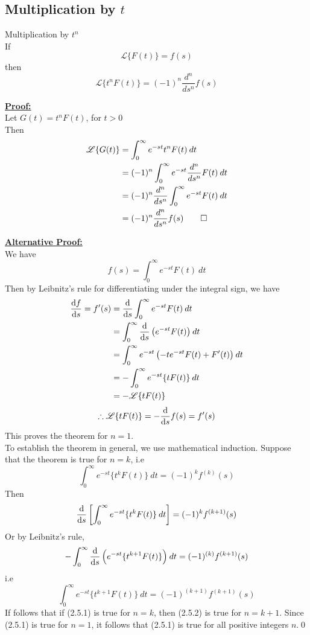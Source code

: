 \documentclass[12pt]{article}
\newcommand{\Lap}{\mathscr{L}}
\begin{document}
\subsection{Multiplication by $t$}
\begin{theorem}{Multiplication by $t^n$}{}
    \\If \[
        \Lap \{ F(t) \} = f(s)
    \] then \[
        \Lap \{ t^nF(t) \} = (-1)^n \frac{d^n}{ds^n} f(s)
    \]
\end{theorem}

\underline{\textbf{Proof: }} \\
Let $G(t) = t^nF(t)$, for $t>0$\\
Then\\
\begin{align*}
    \Lap \{ G(t) \} &= \int_{0}^{\infty} {e^{-st}t^nF(t)} \: d{t} \\
    &= (-1)^n \int_{0}^{\infty} {e^{-st} \frac{d^n}{ds^n} F(t)} \: d{t} \\
    &= (-1)^n \frac{d^n}{ds^n} \int_{0}^{\infty} {e^{-st} F(t)} \: d{t} \\
    &= (-1)^n \frac{d^n}{ds^n} f(s)\qed
\end{align*}

\underline{\textbf{Alternative Proof: }} \\
We have \[
    f(s) = \int_{0}^{\infty} {e^{-st}F(t)} \: d{t}
\]
Then by Leibnitz's rule for differentiating under the integral sign, we have
\begin{align*}
    \dv{f}{s} = f'(s) &= \dv{s} \int_{0}^{\infty} {e^{-st}F(t)} \: d{t} \\
    &= \int_{0}^{\infty} {\dv{s} \left( e^{-st}F(t) \right)} \: d{t} \\
    &= \int_{0}^{\infty} {e^{-st} \left( -te^{-st}F(t) + F'(t) \right)} \: d{t} \\
    &= - \int_{0}^{\infty} {e^{-st} \{ tF(t) \}} \: d{t} \\
    &= - \Lap \{ tF(t) \}
\end{align*}
\[
    \therefore \Lap \{ tF(t) \} = -\dv{s}f(s) = f'(s)
\]
This proves the theorem for $n=1$.\\
To establish the theorem in general, we use mathematical induction. Suppose that the theorem is true for $n=k$, i.e 
\begin{equation} \tag{2.5.1}
    \int_{0}^{\infty} {e^{-st} \{ t^k F(t) \}} \: d{t} = (-1)^k f^{(k)}(s)
\end{equation}
Then \[
    \dv{s} \left[ \int_{0}^{\infty} {e^{-st} \{ t^k F(t) \}} \: d{t} \right] = (-1)^k f^{(k+1)}(s)
\]
Or by Leibnitz's rule, \[
    - \int_{0}^{\infty} {\dv{s} \left( e^{-st} \{ t^{k+1} F(t) \} \right)} \: d{t} = (-1)^{(k)} f^{(k+1)}(s)
\]
i.e 
\begin{equation} \tag{2.5.2}
    \int_{0}^{\infty} {e^{-st} \{ t^{k+1} F(t) \}} \: d{t} = (-1)^{(k+1)} f^{(k+1)}(s)
\end{equation}
If follows that if (2.5.1) is true for $n=k$, then (2.5.2) is true for $n=k+1$. Since (2.5.1) is true for $n=1$, it follows that (2.5.1) is true for all positive integers $n$.\qed\\~\\
\end{document}
